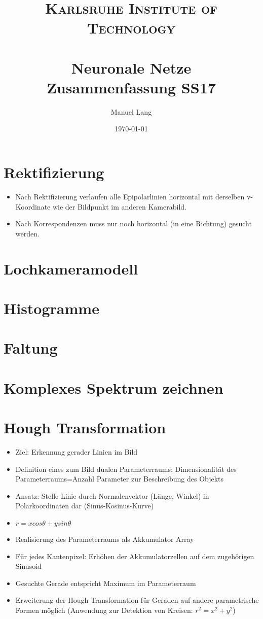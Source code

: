 \documentclass[paper=a4, fontsize=11pt]{scrartcl} %
\title{	
\normalfont \normalsize 
\textsc{Karlsruhe Institute of Technology} \\ [25pt] %
\horrule{0.5pt} \\[0.4cm] %
\huge Neuronale Netze\\ Zusammenfassung SS17 %
\horrule{2pt} \\[0.5cm] %
}
\author{Manuel Lang} %
\date{\normalsize\today} %
\numberwithin{equation}{section} %
\numberwithin{figure}{section} %
\numberwithin{table}{section} %
\begin{document}

\section{Rektifizierung}

\begin{itemize}
\item Nach Rektifizierung verlaufen alle Epipolarlinien horizontal mit derselben v-Koordinate wie der Bildpunkt im anderen Kamerabild. 
\item Nach Korrespondenzen muss nur noch horizontal (in eine Richtung) gesucht werden.
\end{itemize}

\section{Lochkameramodell}

\section{Histogramme}

\section{Faltung}

\section{Komplexes Spektrum zeichnen}

\section{Hough Transformation}

\begin{itemize}
\item Ziel: Erkennung gerader Linien im Bild
\item Definition eines zum Bild dualen Parameterraums: Dimensionalität des Parameterraums=Anzahl Parameter zur Beschreibung des Objekts
\item Ansatz: Stelle Linie durch Normalenvektor (Länge, Winkel) in Polarkoordinaten dar (Sinus-Kosinus-Kurve)
\item $r = x cos \theta + y sin \theta$
\item Realisierung des Parameterraums als Akkumulator Array
\item Für jedes Kantenpixel: Erhöhen der Akkumulatorzellen auf dem zugehörigen Sinusoid
\item Gesuchte Gerade entspricht Maximum im Parameterraum
\item Erweiterung der Hough-Transformation für Geraden auf andere parametrische Formen möglich (Anwendung zur Detektion von Kreisen: $r^2 = x^2 + y^2$)
\end{itemize}
\end{document}
